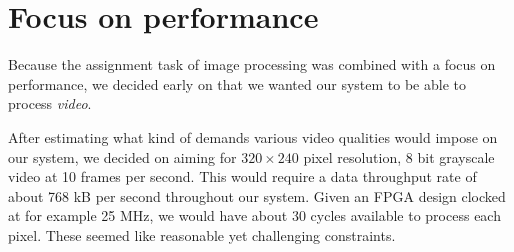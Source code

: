 \section{Focus on performance}\label{sec:perf-focus}

Because the assignment task of image processing was combined with a
focus on performance, we decided early on that we wanted our system to
be able to process \emph{video}.

After estimating what kind of demands various video qualities would
impose on our system, we decided on aiming for $320\times240$ pixel
resolution, 8 bit grayscale video at 10 frames per second. This would
require a data throughput rate of about 768 kB per second throughout our
system. Given an FPGA design clocked at for example 25 MHz, we would
have about 30 cycles available to process each pixel. These seemed
like reasonable yet challenging constraints.
